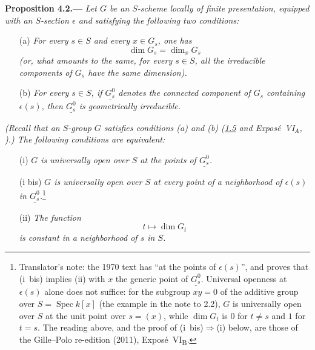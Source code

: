 
\medskip
{}\label{prop:sga3-VIB-4.2}%
\noindent\textbf{Proposition 4.2.---}
\emph{Let \(G\) be an \(S\)-scheme locally of finite presentation,
equipped with an \(S\)-section \(\epsilon\) and satisfying the following
two conditions:}
\begin{enumerate}
\item[\textup{\SGAInlineRefTarget{prop:sga3-VIB-4.2:item:a}(a)}] \emph{For every \(s\in S\) and every
  \(x\in G_s\), one has}
  \[
    \dim G_s=\dim_x G_s
  \]
  \emph{\textup(or, what amounts to the same, for every \(s\in S\), all the
  irreducible components of \(G_s\) have the same dimension\textup).}
\item[\textup{(b)}] \emph{For every \(s\in S\), if \(\underline{G_s^0}\)
  denotes the connected component of \(G_s\) containing
  \(\epsilon(s)\), then \(\underline{G_s^0}\) is geometrically irreducible.}
\end{enumerate}
\emph{\textup(Recall that an \(S\)-group \(G\) satisfies conditions
\textup{(a)} and \textup{(b)} \textup(\hyperref[lem:sga3-VIB-1.5]{1.5} and Expos\'e~VI\(_A\),
\textup).\textup) The following conditions are equivalent:}
\begin{enumerate}
\item[\textup{\SGAInlineRefTarget{prop:sga3-VIB-4.2:item:i}(i)}] \emph{\(G\) is universally open over \(S\) at
  the points of \(\underline{G_s^0}\).}
\item[\textup{(i bis)}] \emph{\(G\) is universally open over \(S\)
  at every point of a neighborhood of \(\epsilon(s)\) in
  \(\underline{G_s^0}\).}\footnote{Translator's note: the 1970 text has ``at the points of
\(\epsilon(s)\)'', and proves that (i~bis) implies (ii) with \(x\) the generic point of \(\underline{G_s^0}\).
Universal openness at \(\epsilon(s)\) alone does not suffice: for the subgroup \(xy=0\) of the additive
group over \(S=\operatorname{Spec}k[x]\) (the example in the note to 2.2), \(G\) is universally open over
\(S\) at the unit point over \(s=(x)\), while \(\dim G_t\) is \(0\) for \(t\neq s\) and \(1\) for \(t=s\).
The reading above, and the proof of (i~bis)\(\Rightarrow\)(i) below, are those of the Gille--Polo
re-edition (2011), Expos\'e~VI\textsubscript{B}.}
\item[\textup{\SGAInlineRefTarget{prop:sga3-VIB-4.2:item:ii}(ii)}] \emph{The function}
  \[
    t\longmapsto\dim G_t
  \]
  \emph{is constant in a neighborhood of \(s\) in \(S\).}
\end{enumerate}

